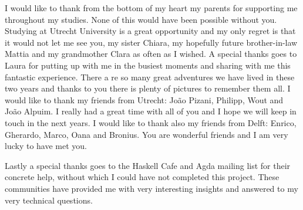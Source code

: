 \documentclass[12pt,a4paper]{report}
\begin{document}
I would like to thank from the bottom of my heart my parents for 
supporting me throughout my studies. None of this would have been possible
without you. Studying at Utrecht University is a great opportunity and
my only regret is that it would not let me see you, my sister Chiara, my hopefully future brother-in-law Mattia and my grandmother Clara as often as I wished.
A special thanks goes to Laura for putting up with me in the busiest moments
and sharing with me this fantastic experience.
There a	re so many great adventures we have lived in these two years and
thanks to you there is plenty of pictures to remember them all.
I would like to thank my friends from Utrecht: João Pizani, Philipp, Wout and João Alpuim. I really had a great time with all of you and I hope we will
keep in touch in the next years.
I would like to thank also my friends from Delft: Enrico, Gherardo, Marco,
Oana and Bronius. You are wonderful friends and I am very lucky to
have met you.

Lastly a special thanks goes to the Haskell Cafe and Agda mailing list
for their concrete help, without which I could have not completed
this project.
These communities have provided me with very interesting insights and answered to my very technical questions.



\end{document}
